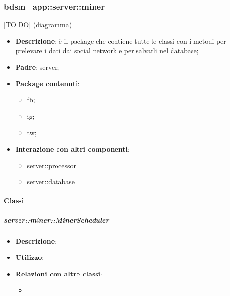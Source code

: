 


\subsubsection{bdsm\_app::server::miner} %
\label{ssub:bdsm_app_server_miner}
[TO DO] (diagramma) \newline \newline

\begin{itemize}
  \item \textbf{Descrizione}: è il package che contiene tutte le classi con i metodi per prelevare i dati dai social network e per salvarli nel database;
  \item \textbf{Padre}: server;
  \item \textbf{Package contenuti}:
  	\begin{itemize}
  		\item fb;
  		\item ig;
  		\item tw;
  	\end{itemize}
  \item \textbf{Interazione con altri componenti}:
  	\begin{itemize}
  		\item server::processor
  		\item server::database
  	\end{itemize}
\end{itemize}

\paragraph{Classi} %
		\subparagraph{server::miner::MinerScheduler} %
		\label{subp:server_miner_MinerScheduler}
			\begin{itemize}
				\item \textbf{Descrizione}:
				\item \textbf{Utilizzo}: 
				\item \textbf{Relazioni con altre classi}:
					\begin{itemize}
						\item 
					\end{itemize}
			\end{itemize}
		
